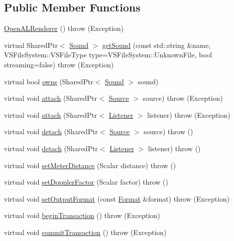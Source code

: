 \subsection*{Public Member Functions}
\begin{DoxyCompactItemize}
\item 
\hyperlink{classAudio_1_1OpenALRenderer_a318984bd7bf639df66c9d2be1fa0b2c4}{Open\+A\+L\+Renderer} ()  throw (\+Exception)
\item 
virtual Shared\+Ptr$<$ \hyperlink{classAudio_1_1Sound}{Sound} $>$ \hyperlink{classAudio_1_1OpenALRenderer_afabd7c8e9655c9cf3c099044e9065cb3}{get\+Sound} (const std\+::string \&name, V\+S\+File\+System\+::\+V\+S\+File\+Type type=V\+S\+File\+System\+::\+Unknown\+File, bool streaming=false)  throw (\+Exception)
\item 
virtual bool \hyperlink{classAudio_1_1OpenALRenderer_aab1e9a5d3f2fbfdd6da039d4adb738bb}{owns} (Shared\+Ptr$<$ \hyperlink{classAudio_1_1Sound}{Sound} $>$ sound)
\item 
virtual void \hyperlink{classAudio_1_1OpenALRenderer_acfaec02c59fad9ef979903a1163efdc4}{attach} (Shared\+Ptr$<$ \hyperlink{classAudio_1_1Source}{Source} $>$ source)  throw (\+Exception)
\item 
virtual void \hyperlink{classAudio_1_1OpenALRenderer_ab3b73edd6387db87461d63a93b95eaf9}{attach} (Shared\+Ptr$<$ \hyperlink{classAudio_1_1Listener}{Listener} $>$ listener)  throw (\+Exception)
\item 
virtual void \hyperlink{classAudio_1_1OpenALRenderer_a58b5e151b4ff99d3ac581519ddee65b4}{detach} (Shared\+Ptr$<$ \hyperlink{classAudio_1_1Source}{Source} $>$ source)  throw ()
\item 
virtual void \hyperlink{classAudio_1_1OpenALRenderer_a4b8bea8b823c86f74b7928af75231f3e}{detach} (Shared\+Ptr$<$ \hyperlink{classAudio_1_1Listener}{Listener} $>$ listener)  throw ()
\item 
virtual void \hyperlink{classAudio_1_1OpenALRenderer_ada98620bc06d5bf68143689736624ade}{set\+Meter\+Distance} (Scalar distance)  throw ()
\item 
virtual void \hyperlink{classAudio_1_1OpenALRenderer_a9361f177b02fb8fe6b0bcda5bbfe95b2}{set\+Doppler\+Factor} (Scalar factor)  throw ()
\item 
virtual void \hyperlink{classAudio_1_1OpenALRenderer_afcc034c847de965fc0aa7330802e2a3c}{set\+Output\+Format} (const \hyperlink{structAudio_1_1Format}{Format} \&format)  throw (\+Exception)
\item 
virtual void \hyperlink{classAudio_1_1OpenALRenderer_a69143a6869f662ed5be61221ecd21a4e}{begin\+Transaction} ()  throw (\+Exception)
\item 
virtual void \hyperlink{classAudio_1_1OpenALRenderer_a6b900a51dc34f303fede8b2210931683}{commit\+Transaction} ()  throw (\+Exception)
\end{DoxyCompactItemize}
